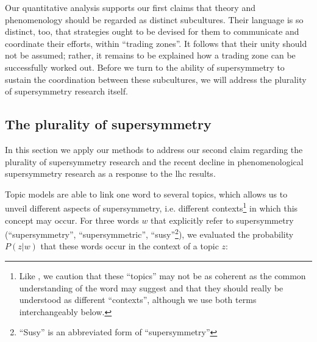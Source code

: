 \documentclass[smallextended]{svjour3}
\begin{document}


Our quantitative analysis supports our first claims that theory and phenomenology should be regarded as distinct subcultures. Their language is so distinct, too, that strategies ought to be devised for them to communicate and coordinate their efforts, within ``trading zones''. It follows that their unity should not be assumed; rather, it remains to be explained how a trading zone can be successfully worked out. Before we turn to the ability of supersymmetry to sustain the coordination between these subcultures, we will address the plurality of supersymmetry research itself.

\subsection{The plurality of supersymmetry}
\label{section:application_plurality}

In this section we apply our methods to address our second claim regarding the plurality of supersymmetry research and the recent decline in phenomenological supersymmetry research as a response to the \gls{lhc} results.

Topic models are able to link one word to several topics, which allows us to unveil different aspects of supersymmetry, i.e. different contexts\footnote{Like \citet{Allen2022}, we caution that these ``topics'' may not be as coherent as the common understanding of the word may suggest and that they should really be understood as different ``contexts'', although we use both terms interchangeably below.} in which this concept may occur. For three words $w$ that explicitly refer to supersymmetry (``supersymmetry'', ``supersymmetric'', ``susy''\footnote{``Susy'' is an abbreviated form of ``supersymmetry''}), we evaluated the probability $P(z|w)$ that these words occur in the context of a topic $z$:
\end{document}
